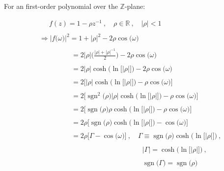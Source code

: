 \documentclass{article}
\DeclareMathOperator{\sgn}{sgn}
\begin{document}
For an first-order polynomial over the $\mathbb{Z}$-plane:

\begin{align*}
    & \quad \ \ f(z) = 1 - \rho z^{-1} \ , \quad \rho \in \mathbb{R} \ , \quad \big|\rho\big| < 1 \\ \\
    & \Rightarrow \Big|f\big(\omega\big)\Big|^{2} = 1 + \big|\rho\big|^{2} - 2\rho\cos\big(\omega\big) \\ \\
    & \quad \quad \quad \quad \ \ \ = 2\big|\rho\big|\Bigg(\frac{\big|\rho\big| + \big|\rho\big|^{-1}}{2}\Bigg) - 2\rho\cos\big(\omega\big) \\ \\
    & \quad \quad \quad \quad \ \ \ = 2\big|\rho\big|\cosh\Big(\ln\big[\big|\rho\big|\big]\Big) - 2\rho\cos\big(\omega\big) \\ \\
    & \quad \quad \quad \quad \ \ \ = 2\Bigg[\big|\rho\big|\cosh\Big(\ln\big[\big|\rho\big|\big]\Big) - \rho\cos\big(\omega\big)\Bigg] \\ \\
    & \quad \quad \quad \quad \ \ \ = 2\Bigg[\sgn^{2}\big(\rho\big)\big|\rho\big|\cosh\Big(\ln\big[\big|\rho\big|\big]\Big) - \rho\cos\big(\omega\big)\Bigg] \\ \\
    & \quad \quad \quad \quad \ \ \ = 2\Bigg[\sgn\big(\rho\big)\rho\cosh\Big(\ln\big[\big|\rho\big|\big]\Big) - \rho\cos\big(\omega\big)\Bigg] \\ \\
    & \quad \quad \quad \quad \ \ \ = 2\rho\Bigg[\sgn\big(\rho\big)\cosh\Big(\ln\big[\big|\rho\big|\big]\Big) - \cos\big(\omega\big)\Bigg] \\ \\
    & \quad \quad \quad \quad \ \ \ = 2\rho\bigg[\Gamma - \cos\big(\omega\big)\bigg] \ , \quad \Gamma \equiv \sgn\big(\rho\big)\cosh\Big(\ln\big[\big|\rho\big|\big]\Big) \ , \\ \\
    & \quad \quad \quad \quad \quad \quad \quad \quad \quad \quad \quad \quad \quad \quad \quad \big|\Gamma\big| = \cosh\Big(\ln\big[\big|\rho\big|\big]\Big) \ , \\ \\
    & \quad \quad \quad \quad \quad \quad \quad \quad \quad \quad \quad \quad \quad \quad \quad \sgn\big(\Gamma\big) = \sgn\big(\rho\big)
  \end{align*}\newline
\end{document}
